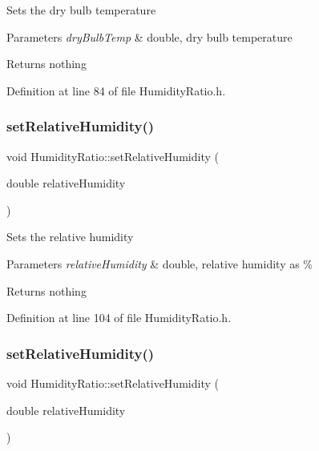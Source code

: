 Sets the dry bulb temperature


\begin{DoxyParams}{Parameters}
{\em dry\+Bulb\+Temp} & double, dry bulb temperature\\
\hline
\end{DoxyParams}
\begin{DoxyReturn}{Returns}
nothing 
\end{DoxyReturn}


Definition at line 84 of file Humidity\+Ratio.\+h.

\mbox{\label{class_humidity_ratio_a110aecb6587a836ab76d4aca840e5759}} 
\subsubsection{\texorpdfstring{set\+Relative\+Humidity()}{setRelativeHumidity()}\hspace{0.1cm}{\footnotesize\ttfamily [1/3]}}
{\footnotesize\ttfamily void Humidity\+Ratio\+::set\+Relative\+Humidity (\begin{DoxyParamCaption}\item[{double}]{relative\+Humidity }\end{DoxyParamCaption})\hspace{0.3cm}{\ttfamily [inline]}}

Sets the relative humidity


\begin{DoxyParams}{Parameters}
{\em relative\+Humidity} & double, relative humidity as \%\\
\hline
\end{DoxyParams}
\begin{DoxyReturn}{Returns}
nothing 
\end{DoxyReturn}


Definition at line 104 of file Humidity\+Ratio.\+h.

\mbox{\label{class_humidity_ratio_a110aecb6587a836ab76d4aca840e5759}} 
\subsubsection{\texorpdfstring{set\+Relative\+Humidity()}{setRelativeHumidity()}\hspace{0.1cm}{\footnotesize\ttfamily [2/3]}}
{\footnotesize\ttfamily void Humidity\+Ratio\+::set\+Relative\+Humidity (\begin{DoxyParamCaption}\item[{double}]{relative\+Humidity }\end{DoxyParamCaption})\hspace{0.3cm}{\ttfamily [inline]}}

